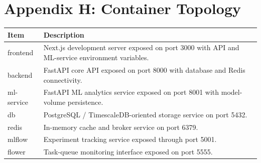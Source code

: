\documentclass[11pt,a4paper]{article}
\begin{document}
\section*{Appendix H: Container Topology}
\begin{longtable}{p{} p{}}
\textbf{Item} & \textbf{Description} \\ \hline
frontend & Next.js development server exposed on port 3000 with API and ML-service environment variables. \\
backend & FastAPI core API exposed on port 8000 with database and Redis connectivity. \\
ml-service & FastAPI ML analytics service exposed on port 8001 with model-volume persistence. \\
db & PostgreSQL / TimescaleDB-oriented storage service on port 5432. \\
redis & In-memory cache and broker service on port 6379. \\
mlflow & Experiment tracking service exposed through port 5001. \\
flower & Task-queue monitoring interface exposed on port 5555. \\
\end{longtable}
\end{document}
